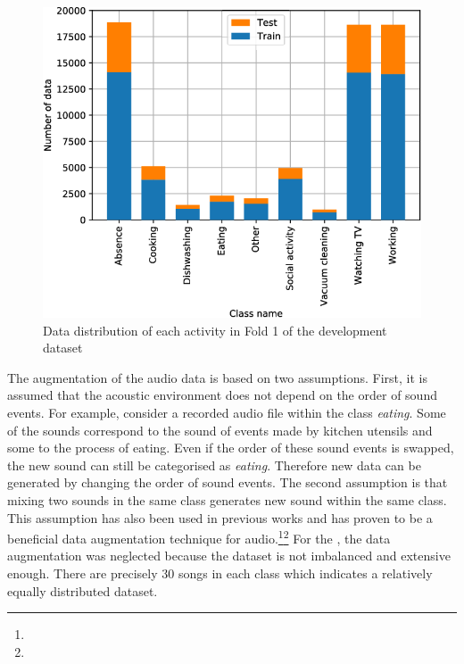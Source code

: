 \begin{figure}[htbp]
	\centering
	\includegraphics[scale=0.35]{baa-documentation/img/DCASE_unbalanced.png}
	\caption[Data distribution of each activity in Fold 1 of the development dataset]{Data distribution of each activity in Fold 1 of the development dataset \footnotemark}
	\label{fig:DCASE-Unbalanced}
\end{figure}
\noindent
\newline
\newline
The augmentation of the audio data is based on two assumptions. First, it is assumed that the acoustic environment does not depend on the order of sound events. For example, consider a recorded audio file within the class \textit{eating}. Some of the sounds correspond to the sound of events made by kitchen utensils and some to the process of eating. Even if the order of these sound events is swapped, the new sound can still be categorised as \textit{eating}. Therefore new data can be generated by changing the order of sound events. The second assumption is that mixing two sounds in the same class generates new sound within the same class. This assumption has also been used in previous works and has proven to be a beneficial data augmentation technique for audio.\footnote{}\footnote{}
\newline
\newline
For the , the data augmentation was neglected because the dataset is not imbalanced and extensive enough. There are precisely 30 songs in each class which indicates a relatively equally distributed dataset.
